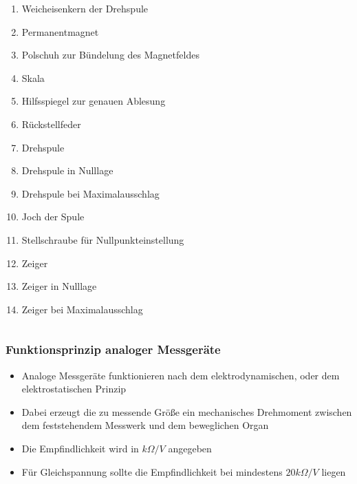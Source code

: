 \begin{frame}
\begin{columns}
    \begin{footnotesize}
      \begin{enumerate}
        \item Weicheisenkern der Drehspule
        \item Permanentmagnet
        \item Polschuh zur Bündelung des Magnetfeldes
        \item Skala
        \item Hilfsspiegel zur genauen Ablesung
        \item Rückstellfeder
        \item Drehspule
        \item Drehspule in Nulllage
        \item Drehspule bei Maximalausschlag
        \item Joch der Spule
        \item Stellschraube für Nullpunkteinstellung
        \item Zeiger
        \item Zeiger in Nulllage
        \item Zeiger bei Maximalausschlag
      \end{enumerate}
    \end{footnotesize}
  \end{columns}
\end{frame}

\begin{frame}
  \frametitle{Funktionsprinzip analoger Messgeräte}
  \begin{itemize}
    \item Analoge Messgeräte funktionieren nach dem elektrodynamischen, oder dem elektrostatischen Prinzip
    \item Dabei erzeugt die zu messende Größe ein mechanisches Drehmoment zwischen dem feststehendem Messwerk und dem beweglichen Organ
    \item Die Empfindlichkeit wird in $k \Omega /V$ angegeben
    \item Für Gleichspannung sollte die Empfindlichkeit bei mindestens $20 k \Omega / V$ liegen
  \end{itemize}
\end{frame}

